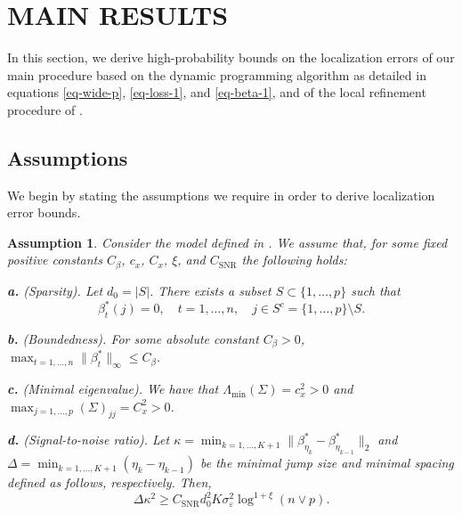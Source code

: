 \documentclass[twoside]{article}
\newtheorem{assume}{Assumption}
\begin{document}
\section{MAIN RESULTS}\label{sec-theory}
In this section, we derive  high-probability bounds on the localization errors of our main procedure based on the dynamic programming algorithm as detailed in equations \ref{eq-wide-p}, \ref{eq-loss-1}, and \ref{eq-beta-1}, and of the local refinement procedure of  .

\subsection{Assumptions}
 
 We begin by stating the assumptions we require in order to derive localization error bounds.
 
\begin{assume} \label{assume:high dim coefficient}  
	Consider the model defined in . We assume that, for some fixed positive constants $C_{\beta}$, $c_x$, $C_x$, $\xi$, and   $C_{\mathrm{SNR}} $ the following holds:%

\noindent \textbf{a.} (Sparsity).  Let $d_0 = |S|$.  There exists a subset $S \subset \{1, \ldots, p\}$ such that 
			\[
				\beta_t^*(j) = 0, \quad t = 1, \ldots, n, \quad j \in S^c = \{1, \ldots, p\} \setminus S.
			\]
			  
			
\noindent \textbf{b.} (Boundedness). For some absolute constant $C_{\beta} > 0$, $\max_{t = 1, \ldots, n} \|\beta_t^*\|_{\infty} \leq C_{\beta}$.
	
\noindent \textbf{c.} (Minimal eigenvalue).  We have that $\Lambda_{\min}(\Sigma) = c_x^2 > 0$  and $\max_{j = 1, \ldots, p} (\Sigma)_{jj} = C_x^2 > 0$.

\noindent \textbf{d.} (Signal-to-noise ratio).  Let $\kappa= \min_{k = 1, \ldots, K + 1} \| \beta^*_{\eta_k} - \beta^*_{\eta_{k-1}}\|_2$ and $\Delta= \min_{k = 1, \ldots, K + 1} (\eta_{k} - \eta_{k-1})$ be the minimal jump size and minimal spacing defined as follows, respectively. Then,
			\begin{equation}\label{eq:snr}
				\Delta \kappa^2 \geq C_{\mathrm{SNR}} d_0^2 K \sigma^2_{\varepsilon}\log^{1 + \xi}(n\vee p).
			\end{equation}
\end{assume}
\end{document}
